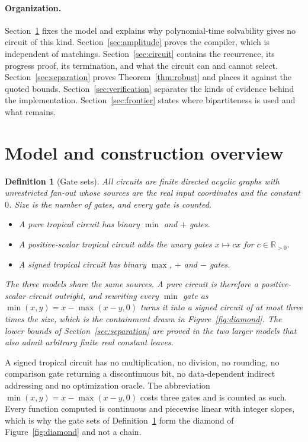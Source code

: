 \documentclass[11pt]{article}
\newtheorem{definition}[theorem]{Definition}
\begin{document}
\paragraph{Organization.}
Section~\ref{sec:model} fixes the model and explains why polynomial-time
solvability gives no circuit of this kind.  Section~\ref{sec:amplitude} proves the
compiler, which is independent of matchings.  Section~\ref{sec:circuit} contains
the recurrence, its progress proof, its termination, and what the circuit can
and cannot select.  Section~\ref{sec:separation}
proves Theorem~\ref{thm:robust} and places it against the quoted bounds.
Section~\ref{sec:verification} separates the kinds of evidence behind the
implementation.  Section~\ref{sec:frontier} states where bipartiteness is used
and what remains.

\section{Model and construction overview}
\label{sec:model}

\begin{definition}[Gate sets]
\label{def:models}
All circuits are finite directed acyclic graphs with unrestricted fan-out whose
sources are the real input coordinates and the constant $0$.  Size is the number
of gates, and every gate is counted.
\begin{itemize}
  \item A \emph{pure tropical} circuit has binary $\min$ and $+$ gates.
  \item A \emph{positive-scalar tropical} circuit adds the unary gates
        $x\mapsto cx$ for $c\in\mathbb R_{>0}$.
  \item A \emph{signed tropical} circuit has binary $\max$, $+$ and $-$ gates.
\end{itemize}
The three models share the same sources.  A pure circuit is therefore a
positive-scalar circuit outright, and rewriting every $\min$ gate as
$\min(x,y)=x-\max(x-y,0)$ turns it into a signed circuit of at most three times
the size, which is the containment drawn in Figure~\ref{fig:diamond}.  The lower
bounds of Section~\ref{sec:separation} are proved in the two larger models that
also admit arbitrary finite real constant leaves.
\end{definition}

A signed tropical circuit has no multiplication, no division, no rounding, no
comparison gate returning a discontinuous bit, no data-dependent indirect
addressing and no optimization oracle.  The abbreviation
$\min(x,y)=x-\max(x-y,0)$ costs three gates and is counted as such.  Every
function computed is continuous and piecewise linear with integer slopes, which
is why the gate sets of Definition~\ref{def:models} form the diamond of
Figure~\ref{fig:diamond} and not a chain.
\end{document}
